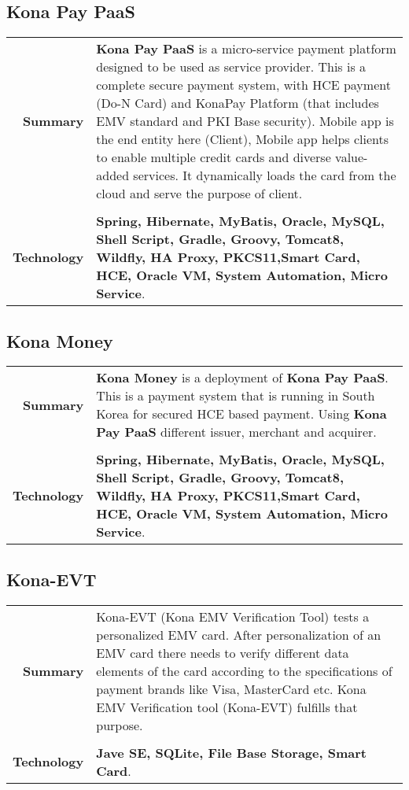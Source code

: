 \documentclass[a4paper,10pt]{article}
\begin{document}
\subsection*{Kona Pay PaaS}
\begin{tabular}{r|p{13cm}}
\textbf{Summary}&\textbf{Kona Pay PaaS} is a micro-service payment platform designed to be used as service provider. This is a complete secure payment system, with HCE payment (Do-N Card) and KonaPay Platform (that includes EMV standard and PKI Base security). Mobile app is the end entity here (Client), Mobile app helps clients to enable multiple credit cards and diverse value-added services. It dynamically loads the card from the cloud and serve the purpose of client.\\\\

\textbf{Technology}& \textbf{Spring, Hibernate, MyBatis, Oracle, MySQL, Shell Script, Gradle, Groovy, Tomcat8, Wildfly, HA Proxy, PKCS11,Smart Card, HCE, Oracle VM, System Automation, Micro Service}. \\
\end{tabular}

\subsection*{Kona Money}
\begin{tabular}{r|p{13cm}}
\textbf{Summary}&\textbf{Kona Money} is a deployment of \textbf{Kona Pay PaaS}. This is a payment system that is running in South Korea for secured HCE based payment. Using \textbf{Kona Pay PaaS} different issuer, merchant and acquirer.\\\\

\textbf{Technology}& \textbf{Spring, Hibernate, MyBatis, Oracle, MySQL, Shell Script, Gradle, Groovy, Tomcat8, Wildfly, HA Proxy, PKCS11,Smart Card, HCE, Oracle VM, System Automation, Micro Service}. \\    
\end{tabular}

\subsection*{Kona-EVT}
\begin{tabular}{r|p{13cm}}
\textbf{Summary}&Kona-EVT (Kona EMV Verification Tool) tests a personalized EMV card. After personalization of an EMV card there needs to verify different data elements of the card according to the specifications of payment brands like Visa, MasterCard etc. Kona EMV Verification tool (Kona-EVT) fulfills that purpose. \\\\
\textbf{Technology}& \textbf{Jave SE, SQLite, File Base Storage, Smart Card}.
\end{tabular}
\end{document}
